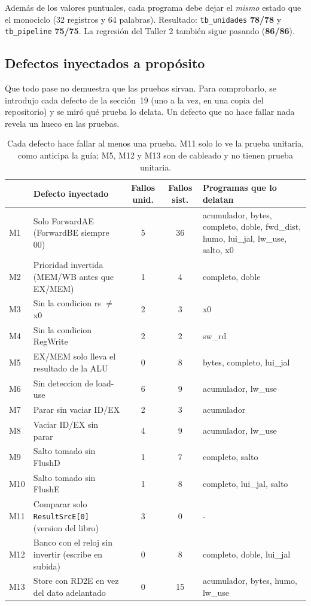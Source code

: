 \documentclass[11pt,letterpaper]{article}
\newcommand{\cod}[1]{\texttt{#1}}
\begin{document}
Adem\'as de los valores puntuales, cada programa debe dejar el \emph{mismo} estado que el monociclo
(32 registros y 64 palabras). Resultado: \cod{tb\_unidades} \textbf{78/78} y \cod{tb\_pipeline}
\textbf{75/75}. La regresi\'on del Taller 2 tambi\'en sigue pasando (\textbf{86/86}).

\subsection{Defectos inyectados a prop\'osito}\label{sec:mutantes}
Que todo pase no demuestra que las pruebas sirvan. Para comprobarlo, se introdujo cada defecto de la
secci\'on~19 (uno a la vez, en una copia del repositorio) y se miró qu\'e prueba lo delata. Un defecto
que no hace fallar nada revela un hueco en las pruebas.

\begin{table}[!htbp]
\centering\footnotesize
\begin{tabularx}{\textwidth}{@{}l X c c X@{}}
\toprule
& \textbf{Defecto inyectado} & \textbf{Fallos unid.} & \textbf{Fallos sist.} & \textbf{Programas que lo delatan} \\
\midrule
M1 & Solo ForwardAE (ForwardBE siempre 00) & 5 & 36 & acumulador, bytes, completo, doble, fwd\_dist, humo, lui\_jal, lw\_use, salto, x0 \\
M2 & Prioridad invertida (MEM/WB antes que EX/MEM) & 1 & 4 & completo, doble \\
M3 & Sin la condicion rs $\neq$ x0 & 2 & 3 & x0 \\
M4 & Sin la condicion RegWrite & 2 & 2 & sw\_rd \\
M5 & EX/MEM solo lleva el resultado de la ALU & 0 & 8 & bytes, completo, lui\_jal \\
M6 & Sin deteccion de load-use & 6 & 9 & acumulador, lw\_use \\
M7 & Parar sin vaciar ID/EX & 2 & 3 & acumulador \\
M8 & Vaciar ID/EX sin parar & 4 & 9 & acumulador, lw\_use \\
M9 & Salto tomado sin FlushD & 1 & 7 & completo, salto \\
M10 & Salto tomado sin FlushE & 1 & 8 & completo, lui\_jal, salto \\
M11 & Comparar solo \cod{ResultSrcE[0]} (version del libro) & 3 & 0 & - \\
M12 & Banco con el reloj sin invertir (escribe en subida) & 0 & 8 & completo, doble, lui\_jal \\
M13 & Store con RD2E en vez del dato adelantado & 0 & 15 & acumulador, bytes, humo, lw\_use \\
\bottomrule
\end{tabularx}
\caption{Cada defecto hace fallar al menos una prueba. M11 solo lo ve la prueba unitaria, como anticipa
la gu\'ia; M5, M12 y M13 son de cableado y no tienen prueba unitaria.}
\end{table}
\end{document}
